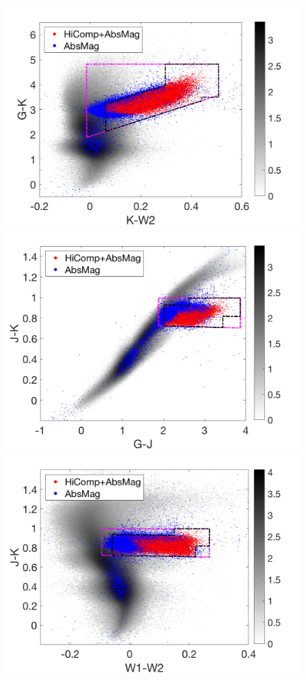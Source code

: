 \begin{figure}
\centering
\vspace{-3cm}
\includegraphics[height=0.3\textheight]{AbsGKKW2.png}\\
\includegraphics[height=0.3\textheight]{AbsJKGJ.png}\\
\includegraphics[height=0.3\textheight]{AbsJKW1W2.png}

\end{figure}
